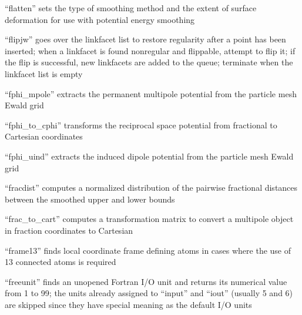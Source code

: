 \documentclass[letterpaper,11pt,english]{sphinxmanual}
\begin{document}
\sphinxAtStartPar
{}

\sphinxAtStartPar
“flatten” sets the type of smoothing method and the extent of surface deformation for use with potential energy smoothing

\sphinxAtStartPar
{}

\sphinxAtStartPar
“flipjw” goes over the linkfacet list to restore regularity after a point has been inserted; when a linkfacet is found nonregular and flippable, attempt to flip it; if the flip is successful, new linkfacets are added to the queue; terminate when the linkfacet list is empty

\sphinxAtStartPar
{}

\sphinxAtStartPar
“fphi\_mpole” extracts the permanent multipole potential from the particle mesh Ewald grid

\sphinxAtStartPar
{}

\sphinxAtStartPar
“fphi\_to\_cphi” transforms the reciprocal space potential from fractional to Cartesian coordinates

\sphinxAtStartPar
{}

\sphinxAtStartPar
“fphi\_uind” extracts the induced dipole potential from the particle mesh Ewald grid

\sphinxAtStartPar
{}

\sphinxAtStartPar
“fracdist” computes a normalized distribution of the pairwise fractional distances between the smoothed upper and lower bounds

\sphinxAtStartPar
{}

\sphinxAtStartPar
“frac\_to\_cart” computes a transformation matrix to convert a multipole object in fraction coordinates to Cartesian

\sphinxAtStartPar
{}

\sphinxAtStartPar
“frame13” finds local coordinate frame defining atoms in cases where the use of 1\sphinxhyphen{}3 connected atoms is required

\sphinxAtStartPar
{}

\sphinxAtStartPar
“freeunit” finds an unopened Fortran I/O unit and returns its numerical value from 1 to 99; the units already assigned to “input” and “iout” (usually 5 and 6) are skipped since they have special meaning as the default I/O units
\end{document}
